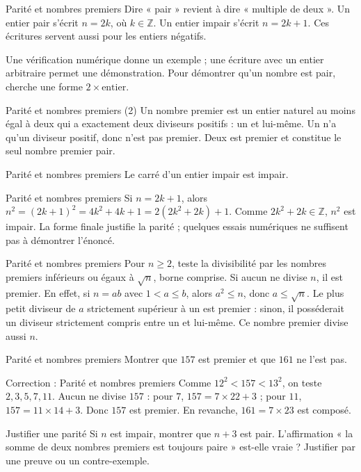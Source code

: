 \documentclass[aspectratio=169,10pt]{beamer}
\providecommand{\Z}{\mathbb{Z}}
\begin{document}
\begin{frame}{Parité et nombres premiers}
Dire « pair » revient à dire « multiple de deux ». Un entier pair s'écrit \(n=2k\), où \(k\in\Z\). Un entier impair s'écrit \(n=2k+1\). Ces écritures servent aussi pour les entiers négatifs.

Une vérification numérique donne un exemple ; une écriture avec un entier arbitraire permet une démonstration. Pour démontrer qu'un nombre est pair, cherche une forme \(2\times\text{entier}\).
\end{frame}
\begin{frame}{Parité et nombres premiers (2)}
Un nombre premier est un entier naturel au moins égal à deux qui a exactement deux diviseurs positifs : un et lui-même. Un n'a qu'un diviseur positif, donc n'est pas premier. Deux est premier et constitue le seul nombre premier pair.
\end{frame}
\begin{frame}{Parité et nombres premiers}
Le carré d'un entier impair est impair.
\end{frame}
\begin{frame}{Parité et nombres premiers}
Si \(n=2k+1\), alors \(n^2=(2k+1)^2=4k^2+4k+1=2(2k^2+2k)+1\). Comme \(2k^2+2k\in\Z\), \(n^2\) est impair. La forme finale justifie la parité ; quelques essais numériques ne suffisent pas à démontrer l'énoncé.
\end{frame}
\begin{frame}{Parité et nombres premiers}
Pour \(n\ge2\), teste la divisibilité par les nombres premiers inférieurs ou égaux à \(\sqrt n\), borne comprise. Si aucun ne divise \(n\), il est premier. En effet, si \(n=ab\) avec \(1<a\le b\), alors \(a^2\le n\), donc \(a\le\sqrt n\). Le plus petit diviseur de \(a\) strictement supérieur à un est premier : sinon, il posséderait un diviseur strictement compris entre un et lui-même. Ce nombre premier divise aussi \(n\).
\end{frame}
\begin{frame}{Parité et nombres premiers}
Montrer que \(157\) est premier et que \(161\) ne l'est pas.
\end{frame}
\begin{frame}{Correction : Parité et nombres premiers}
Comme \(12^2<157<13^2\), on teste \(2,3,5,7,11\). Aucun ne divise \(157\) : pour \(7\), \(157=7\times22+3\) ; pour \(11\), \(157=11\times14+3\). Donc \(157\) est premier. En revanche, \(161=7\times23\) est composé.
\end{frame}
\begin{frame}{Justifier une parité}
Si \(n\) est impair, montrer que \(n+3\) est pair. L’affirmation « la somme de deux nombres premiers est toujours paire » est-elle vraie ? Justifier par une preuve ou un contre-exemple.
\end{frame}
\end{document}

